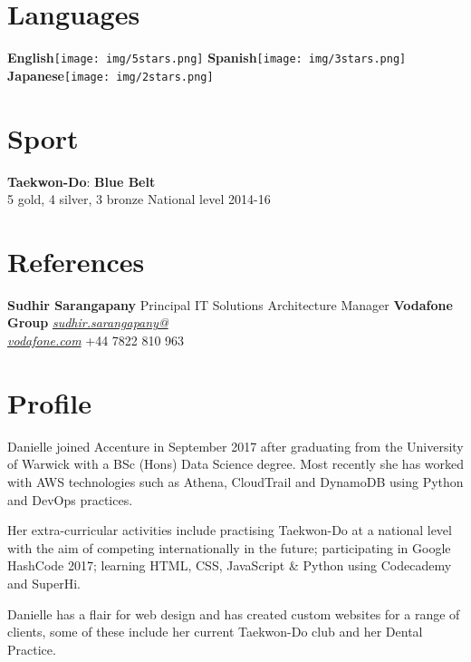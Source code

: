 \documentclass[]{friggeri-cv}
\begin{document}
\begin{aside}
    \section{Languages}
        \textbf{English}\texttt{[image: img/5stars.png]}
        \textbf{Spanish}\texttt{[image: img/3stars.png]}
        \textbf{Japanese}\texttt{[image: img/2stars.png]}
    ~
    \section{Sport}
        \textbf{Taekwon-Do}:
        \textbf{Blue Belt}\\5 gold, 4 silver, 3 bronze
        National level 2014-16
    ~
    \section{References}
        \textbf{Sudhir Sarangapany}
        Principal IT Solutions Architecture Manager
        \textbf{Vodafone Group}
        \href{mailto:sudhir.sarangapany@vodafone.com}{\emph{sudhir.sarangapany@\\vodafone.com}}
        +44 7822 810 963
    ~
\end{aside}

\section{Profile}
      Danielle joined Accenture in September 2017 after graduating from the University of Warwick with a BSc (Hons) Data Science degree. Most recently she has worked with AWS technologies such as Athena, CloudTrail and DynamoDB using Python and DevOps practices.
      
      Her extra-curricular activities include practising Taekwon-Do at a national level with the aim of competing internationally in the future; participating in Google HashCode 2017; learning HTML, CSS, JavaScript \& Python using Codecademy and SuperHi.
      
      Danielle has a flair for web design and has created custom websites for a range of clients, some of these include her current Taekwon-Do club and her Dental Practice.
\end{document}
